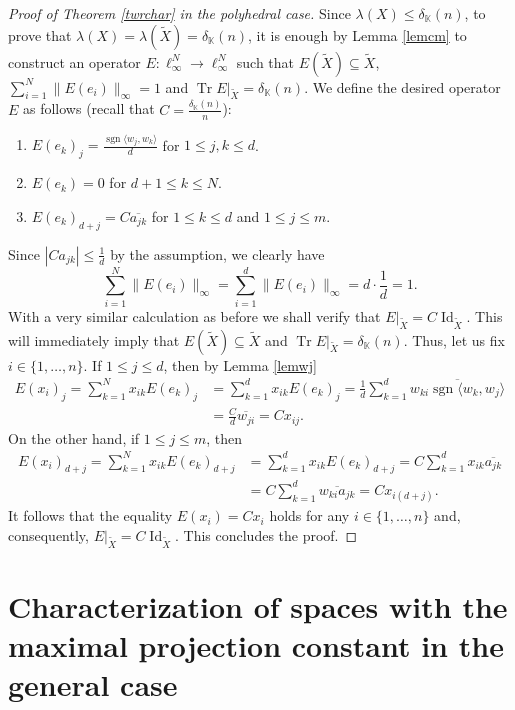\documentclass[12pt, reqno]{amsart}
\theoremstyle{definition}
\theoremstyle{remark}
\numberwithin{equation}{section}
\DeclareMathOperator{\tr}{Tr}
\DeclareMathOperator{\sgn}{sgn}
\DeclareMathOperator{\id}{Id}
\begin{document}
\begin{proof}[Proof of Theorem \ref{twrchar} in the polyhedral case]
Since $\lambda(X) \leq \delta_{\mathbb{K}}(n)$, to prove that $\lambda(X)=\lambda(\widetilde{X}) = \delta_{\mathbb{K}}(n)$, it is enough by Lemma \ref{lemcm} to construct an operator $E: \ell_{\infty}^N \to \ell_{\infty}^N$ such that $E(\widetilde{X}) \subseteq \widetilde{X}$, $\sum_{i=1}^{N} \|E(e_i)\|_{\infty}=1$ and $\tr E|_{\widetilde{X}} = \delta_{\mathbb{K}}(n)$. We define the desired operator $E$ as follows (recall that $C=\frac{\delta_{\mathbb{K}}(n)}{n}$):
\begin{enumerate}
\item $E(e_k)_j = \frac{\sgn \langle w_j, w_k \rangle}{d}$ for $1 \leq j, k \leq d$.
\item $E(e_k) = 0$ for $d+1 \leq k \leq N$.
\item $E(e_k)_{d+j} = C \overline{a_{jk}}$ for $1 \leq k \leq d$ and $1 \leq j \leq m$.
\end{enumerate}
Since $|Ca_{jk}| \leq \frac{1}{d}$ by the assumption, we clearly have
$$\sum_{i=1}^{N} \|E(e_i)\|_{\infty}=\sum_{i=1}^{d} \|E(e_i)\|_{\infty} = d \cdot \frac{1}{d}=1.$$
With a very similar calculation as before we shall verify that $E|_{\widetilde{X}}=  C\id_{\widetilde{X}}$. This will immediately imply that $E(\widetilde{X}) \subseteq \widetilde{X}$ and $\tr E|_{\widetilde{X}} = \delta_{\mathbb{K}}(n)$. Thus, let us fix $i \in \{1, \ldots, n\}$. If $1 \leq j \leq d$, then by Lemma \ref{lemwj}
\begin{align*}
E(x_i)_j =  \sum_{k=1}^{N} x_{ik} E(e_k)_j &= \sum_{k=1}^{d} x_{ik} E(e_k)_j = \frac{1}{d} \sum_{k=1}^{d} \overline{w_{ki} \sgn \langle w_k, w_j \rangle} \\
&=\frac{C}{d} \overline{w_{ji}} = C x_{ij}.
\end{align*}
On the other hand, if $1 \leq j \leq m$, then
\begin{align*}
E(x_i)_{d+j} =  \sum_{k=1}^{N} x_{ik} E(e_k)_{d+j} &= \sum_{k=1}^{d} x_{ik} E(e_k)_{d+j} = C \sum_{k=1}^{d} x_{ik} \overline{a_{jk}} \\
&=C \sum_{k=1}^{d} \overline{w_{ki} a_{jk}} = Cx_{i(d+j)}.
\end{align*}
It follows that the equality $E(x_i)=Cx_i$ holds for any $i \in \{1, \ldots, n\}$ and, consequently, $E|_{\widetilde{X}}= C \id_{\widetilde{X}}$. This concludes the proof. 

\end{proof}



\section{Characterization of spaces with the maximal projection constant in the general case}
\label{secchargeneral}
\end{document}
